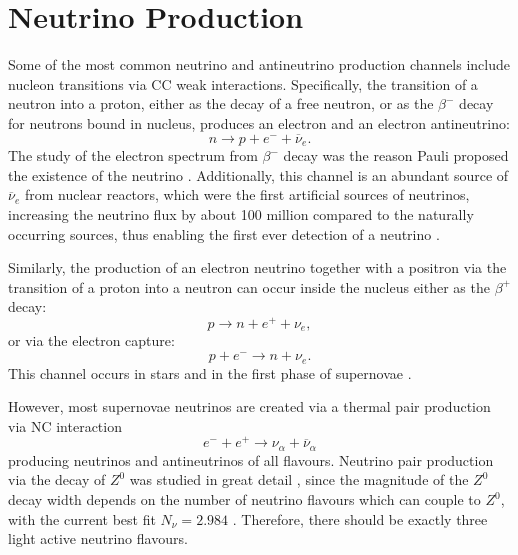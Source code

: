 \section{Neutrino Production}
Some of the most common neutrino and antineutrino production channels include nucleon transitions via \gls{CC} weak interactions. Specifically, the transition of a neutron into a proton, either as the decay of a free neutron, or as the $\beta^-$ decay for neutrons bound in nucleus, produces an electron and an electron antineutrino:
\begin{equation}
n\rightarrow p+e^-+\overline{\nu}_e.
\end{equation}
The study of the electron spectrum from $\beta^-$ decay was the reason Pauli proposed the existence of the neutrino \cite{PauliNeutrinoProposalLetter.pdf}. Additionally, this channel is an abundant source of $\overline{\nu}_e$ from nuclear reactors, which were the first artificial sources of neutrinos, increasing the neutrino flux by about 100 million compared to the naturally occurring sources, thus enabling the first ever detection of a neutrino \cite{CowanReinesFirstAttempt.pdf, CowanReinesConfirmation.pdf, NeutrinoPhysicsCowanReines.pdf}.

Similarly, the production of an electron neutrino together with a positron via the transition of a proton into a neutron can occur inside the nucleus either as the $\beta^+$ decay:
\begin{equation}
p\rightarrow n+e^++\nu_e,
\end{equation}
or via the electron capture:
\begin{equation}
p+e^-\rightarrow n+\nu_e.
\end{equation}
This channel occurs in stars and in the first phase of supernovae \cite{FundamentalsOfNeutrinoPhysics.pdf}.

However, most supernovae neutrinos are created via a thermal pair production via \gls{NC} interaction
\begin{equation}
e^-+e^+\rightarrow\nu_\alpha+\overline{\nu}_\alpha
\end{equation}
producing neutrinos and antineutrinos of all flavours. Neutrino pair production via the decay of $Z^0$ was studied in great detail \cite{ZDecay.pdf}, since the magnitude of the $Z^0$ decay width depends on the number of neutrino flavours which can couple to $Z^0$, with the current best fit $N_\nu=2.984$ \cite{ZDecayPrecise.pdf}. Therefore, there should be exactly three light active neutrino flavours.

